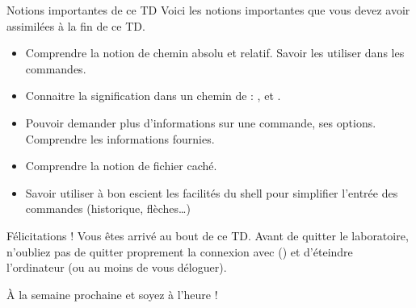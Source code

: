 \documentclass[a4paper,11pt]{style-esi/td}
\begin{document}
	\begin{theorie}{Notions importantes de ce TD}
		Voici les notions importantes que vous devez avoir assimilées à la fin de ce TD.
		\begin{itemize}
		\item 
			Comprendre la notion de chemin absolu et relatif.
			Savoir les utiliser dans les commandes.
		\item 
			Connaitre la signification dans un chemin de : 
			\og{}\samp{\textasciitilde}\fg{},
			\og{}\fg{} et \og{}\fg{}.
		\item 
			Pouvoir demander plus d'informations sur une commande, ses options.
			Comprendre les informations fournies.
		\item 
			Comprendre la notion de fichier caché.
		\item 
			Savoir utiliser à bon escient les facilités du shell
			pour simplifier l'entrée des commandes (historique, flèches\dots)
		\end{itemize}
	\end{theorie}

	\bigskip
	\begin{infotbox}{Félicitations !} 
		Vous êtes arrivé au bout de ce TD.
		Avant de quitter le laboratoire, n'oubliez pas de quitter proprement 
		la connexion avec  () 
		et d'éteindre l'ordinateur (ou au moins de vous déloguer).

		À la semaine prochaine et soyez à l'heure !
	\end{infotbox}
\end{document}
